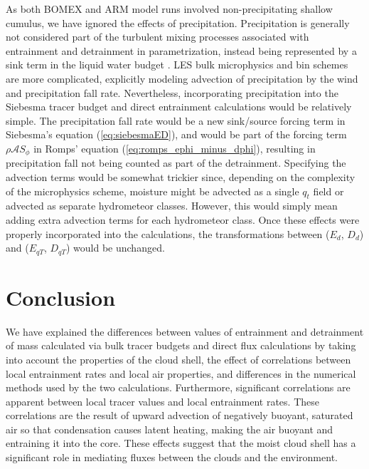 \documentclass[12pt]{article}
\begin{document}
As both BOMEX and ARM model runs involved non-precipitating shallow cumulus, 
we have ignored the effects of precipitation.  Precipitation is generally not
considered part of the turbulent mixing processes associated with entrainment 
and detrainment in parametrization, instead being represented by a sink 
term in the liquid water budget \citep{Tiedtke1989, Kain1990}.  LES bulk microphysics and bin schemes 
are more complicated, explicitly modeling 
advection of precipitation by the wind and precipitation fall rate.  
Nevertheless, incorporating precipitation into the Siebesma tracer budget 
and direct entrainment calculations would be relatively simple.  The
precipitation fall rate would be a new sink/source forcing term in Siebesma's
equation (\ref{eq:siebesmaED}),
and would be part of the forcing term $\rho \mathcal{A}S_\phi$ in Romps'
 equation (\ref{eq:romps_ephi_minus_dphi}), resulting in precipitation fall 
not being counted as part of the detrainment.  Specifying the advection terms would
be somewhat trickier since, depending on the complexity of the microphysics 
scheme, moisture might be advected as a single $q_t$ field or advected as 
separate hydrometeor classes.  However, this would simply mean adding extra 
advection terms for each hydrometeor class.  Once these effects were properly
incorporated into the calculations, the transformations between 
($E_d$, $D_d$) and ($E_{qT}$, $D_{qT}$) would be unchanged.


\section{Conclusion}

We have explained the differences between values of entrainment and detrainment 
of mass calculated via bulk tracer budgets and direct flux calculations by 
taking into account the properties of the cloud shell, the effect of 
correlations between local entrainment rates and local air properties, 
and differences in the numerical methods used by the two calculations.  
Furthermore, significant correlations are apparent between local tracer 
values and local entrainment rates.  These correlations are the result of 
upward advection of negatively buoyant, saturated air so that
condensation causes latent heating, making the air buoyant and entraining it 
into the core.  These effects suggest that the moist cloud shell has a
significant role in mediating fluxes between the clouds and the environment. 
\end{document}
